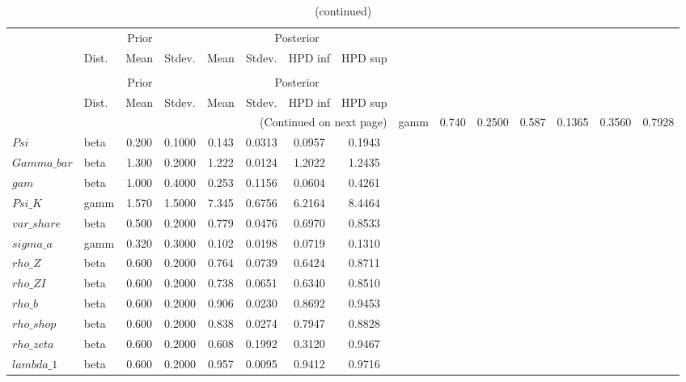  
\begin{center}
\begin{longtable}{llcccccc} 
\caption{Results from Metropolis-Hastings (parameters)}
 \label{Table:MHPosterior:1}\\
\toprule 
  & \multicolumn{3}{c}{Prior}  &  \multicolumn{4}{c}{Posterior} \\
  \cmidrule(r{.75em}){2-4} \cmidrule(r{.75em}){5-8}
  & Dist. & Mean  & Stdev. & Mean & Stdev. & HPD inf & HPD sup\\
\midrule \endfirsthead 
\caption{(continued)}\\\toprule 
  & \multicolumn{3}{c}{Prior}  &  \multicolumn{4}{c}{Posterior} \\
  \cmidrule(r{.75em}){2-4} \cmidrule(r{.75em}){5-8}
  & Dist. & Mean  & Stdev. & Mean & Stdev. & HPD inf & HPD sup\\
\midrule \endhead 
\bottomrule \multicolumn{8}{r}{(Continued on next page)} \endfoot 
\bottomrule \endlastfoot 
$psi\_inv$ & gamm &   0.740 & 0.2500 &   0.587& 0.1365 &  0.3560 &  0.7928 \\ 
$Psi$ & beta &   0.200 & 0.1000 &   0.143& 0.0313 &  0.0957 &  0.1943 \\ 
$Gamma\_bar$ & beta &   1.300 & 0.2000 &   1.222& 0.0124 &  1.2022 &  1.2435 \\ 
$gam$ & beta &   1.000 & 0.4000 &   0.253& 0.1156 &  0.0604 &  0.4261 \\ 
$Psi\_K$ & gamm &   1.570 & 1.5000 &   7.345& 0.6756 &  6.2164 &  8.4464 \\ 
$var\_share$ & beta &   0.500 & 0.2000 &   0.779& 0.0476 &  0.6970 &  0.8533 \\ 
$sigma\_a$ & gamm &   0.320 & 0.3000 &   0.102& 0.0198 &  0.0719 &  0.1310 \\ 
$rho\_Z$ & beta &   0.600 & 0.2000 &   0.764& 0.0739 &  0.6424 &  0.8711 \\ 
$rho\_ZI$ & beta &   0.600 & 0.2000 &   0.738& 0.0651 &  0.6340 &  0.8510 \\ 
$rho\_b$ & beta &   0.600 & 0.2000 &   0.906& 0.0230 &  0.8692 &  0.9453 \\ 
$rho\_shop$ & beta &   0.600 & 0.2000 &   0.838& 0.0274 &  0.7947 &  0.8828 \\ 
$rho\_zeta$ & beta &   0.600 & 0.2000 &   0.608& 0.1992 &  0.3120 &  0.9467 \\ 
$lambda\_1$ & beta &   0.600 & 0.2000 &   0.957& 0.0095 &  0.9412 &  0.9716 \\ 
\end{longtable}
 \end{center}
